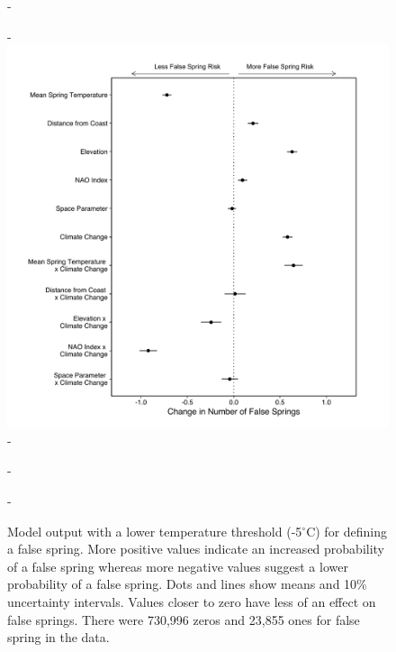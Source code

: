 \documentclass{article}\usepackage[]{graphicx}\usepackage[]{color}
\begin{document}
{{\begin{figure} [H]
  -\begin{center}
  -\includegraphics[width=12cm]{..//analyses/figures/model_output_five_90.pdf}
  -\caption{Model output with a lower temperature threshold (-5$^{\circ}$C) for defining a false spring. More positive values indicate an increased probability of a false spring whereas more negative values suggest a lower probability of a false spring. Dots and lines show means and 10\% uncertainty intervals. Values closer to zero have less of an effect on false springs. There were 730,996 zeros and 23,855 ones for false spring in the data.}\label{fig:five}
  -\end{center}
  -\end{figure}}
  
}
\end{document}
